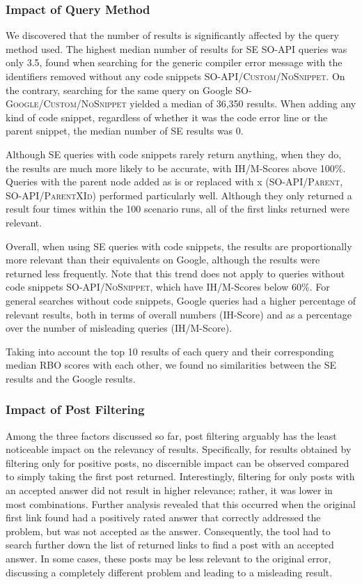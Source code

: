 \documentclass[preprint,12pt]{elsarticle}
\begin{document}
\subsubsection{Impact of Query Method}

We discovered that the number of results is significantly affected by the query method used. The highest median number of results for SE \textsc{SO-API} queries was only 3.5, found when searching for the generic compiler error message with the identifiers removed without any code snippets \textsc{SO-API/Custom/NoSnippet}. On the contrary, searching for the same query on Google \textsc{SO-Google/Custom/NoSnippet} yielded a median of 36,350 results. When adding any kind of code snippet, regardless of whether it was the code error line or the parent snippet, the median number of SE results was 0.

Although SE queries with code snippets rarely return anything, when they do, the results are much more likely to be accurate, with IH/M-Scores above 100\%. Queries with the parent node added as is or replaced with x (\textsc{SO-API/Parent}, \textsc{SO-API/ParentXId}) performed particularly well. Although they only returned a result four times within the 100 scenario runs, all of the first links returned were relevant.

Overall, when using SE queries with code snippets, the results are proportionally more relevant than their equivalents on Google, although the results were returned less frequently. Note that this trend does not apply to queries without code snippets \textsc{SO-API/NoSnippet}, which have IH/M-Scores below 60\%. For general searches without code snippets, Google queries had a higher percentage of relevant results, both in terms of overall numbers (IH-Score) and as a percentage over the number of misleading queries (IH/M-Score).

Taking into account the top 10 results of each query and their corresponding median RBO scores with each other, we found no similarities between the SE results and the Google results.

\subsubsection{Impact of Post Filtering}

Among the three factors discussed so far, post filtering arguably has the least noticeable impact on the relevancy of results. Specifically, for results obtained by filtering only for positive posts, no discernible impact can be observed compared to simply taking the first post returned. Interestingly, filtering for only posts with an accepted answer did not result in higher relevance; rather, it was lower in most combinations. Further analysis revealed that this occurred when the original first link found had a positively rated answer that correctly addressed the problem, but was not accepted as the answer. Consequently, the tool had to search further down the list of returned links to find a post with an accepted answer. In some cases, these posts may be less relevant to the original error, discussing a completely different problem and leading to a misleading result.
\end{document}
